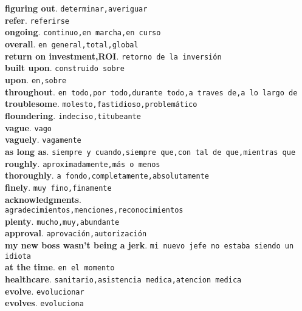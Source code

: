 \documentclass[twocolumn]{article}
\begin{document}
	\textsf{\textbf{figuring out}}. \texttt{determinar,averiguar}\\
	\textsf{\textbf{refer}}. \texttt{referirse}\\
	\textsf{\textbf{ongoing}}. \texttt{continuo,en marcha,en curso}\\
	\textsf{\textbf{overall}}. \texttt{en general,total,global}\\
	\textsf{\textbf{return on investment,ROI}}. \texttt{retorno de la inversi\'on}\\
	\textsf{\textbf{built upon}}. \texttt{construido sobre}\\
	\textsf{\textbf{upon}}. \texttt{en,sobre}\\
	\textsf{\textbf{throughout}}. \texttt{en todo,por todo,durante todo,a traves de,a lo largo de}\\
	\textsf{\textbf{troublesome}}. \texttt{molesto,fastidioso,problem\'atico}\\
	\textsf{\textbf{floundering}}. \texttt{indeciso,titubeante}\\
	\textsf{\textbf{vague}}. \texttt{vago}\\
	\textsf{\textbf{vaguely}}. \texttt{vagamente}\\
	\textsf{\textbf{as long as}}. \texttt{siempre y cuando,siempre que,con tal de que,mientras que}\\
	\textsf{\textbf{roughly}}. \texttt{aproximadamente,m\'as o menos}\\
	\textsf{\textbf{thoroughly}}. \texttt{a fondo,completamente,absolutamente}\\
	\textsf{\textbf{finely}}. \texttt{muy fino,finamente}\\
	\textsf{\textbf{acknowledgments}}.\\ \texttt{agradecimientos,menciones,reconocimientos}\\
	\textsf{\textbf{plenty}}. \texttt{mucho,muy,abundante}\\
	\textsf{\textbf{approval}}. \texttt{aprovaci\'on,autorizaci\'on}\\
	\textsf{\textbf{my new boss wasn't being a jerk}}. \texttt{mi nuevo jefe no estaba siendo un idiota}\\
	\textsf{\textbf{at the time}}. \texttt{en el momento}\\
	\textsf{\textbf{healthcare}}. \texttt{sanitario,asistencia medica,atencion medica}\\
	\textsf{\textbf{evolve}}. \texttt{evolucionar}\\
	\textsf{\textbf{evolves}}. \texttt{evoluciona}\\
\end{document}

